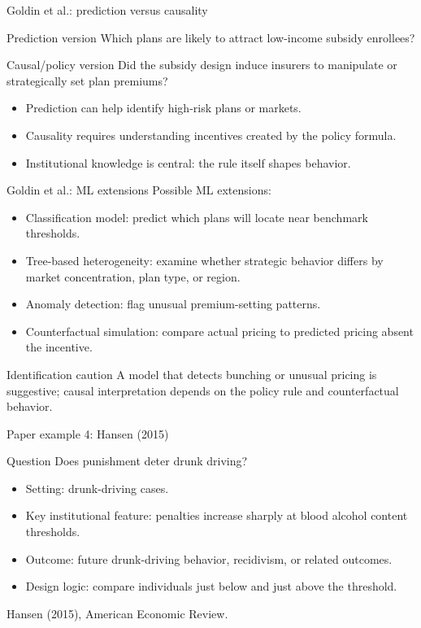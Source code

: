 \documentclass[aspectratio=169,11pt]{beamer}
\newcommand{\smallcite}[1]{{\scriptsize \textcolor{WLUGray}{#1}}}
\begin{document}
\begin{frame}{Goldin et al.: prediction versus causality}
\begin{block}{Prediction version}
Which plans are likely to attract low-income subsidy enrollees?
\end{block}
\begin{alertblock}{Causal/policy version}
Did the subsidy design induce insurers to manipulate or strategically set plan premiums?
\end{alertblock}
\begin{itemize}
  \item Prediction can help identify high-risk plans or markets.
  \item Causality requires understanding incentives created by the policy formula.
  \item Institutional knowledge is central: the rule itself shapes behavior.
\end{itemize}
\end{frame}

\begin{frame}{Goldin et al.: ML extensions}
Possible ML extensions:
\begin{itemize}
  \item Classification model: predict which plans will locate near benchmark thresholds.
  \item Tree-based heterogeneity: examine whether strategic behavior differs by market concentration, plan type, or region.
  \item Anomaly detection: flag unusual premium-setting patterns.
  \item Counterfactual simulation: compare actual pricing to predicted pricing absent the incentive.
\end{itemize}
\begin{alertblock}{Identification caution}
A model that detects bunching or unusual pricing is suggestive; causal interpretation depends on the policy rule and counterfactual behavior.
\end{alertblock}
\end{frame}

\begin{frame}{Paper example 4: Hansen (2015)}
\begin{block}{Question}
Does punishment deter drunk driving?
\end{block}
\begin{itemize}
  \item Setting: drunk-driving cases.
  \item Key institutional feature: penalties increase sharply at blood alcohol content thresholds.
  \item Outcome: future drunk-driving behavior, recidivism, or related outcomes.
  \item Design logic: compare individuals just below and just above the threshold.
\end{itemize}
\smallcite{Hansen (2015), American Economic Review.}
\end{frame}
\end{document}
